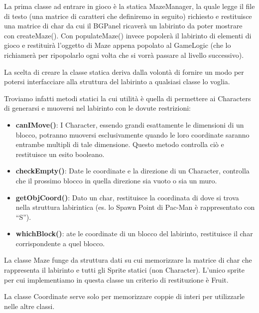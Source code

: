\documentclass[12pt,a4paper]{report}
\begin{document}
La prima classe ad entrare in gioco è la statica MazeManager, la quale legge il file di testo (una matrice di caratteri che definiremo in seguito) richiesto e restituisce una matrice di char da cui il BGPanel ricaverà un labirinto da poter mostrare con createMaze(). Con populateMaze() invece popolerà il labirinto di elementi di gioco e restituirà l’oggetto di Maze appena popolato al GameLogic (che lo richiamerà per ripopolarlo ogni volta che si vorrà passare al livello successivo).

La scelta di creare la classe statica deriva dalla volontà di fornire un modo per potersi interfacciare alla struttura del labirinto a qualsiasi classe lo voglia.

Troviamo infatti metodi statici la cui utilità è quella di permettere ai Characters di generarsi e muoversi nel labirinto con le dovute restrizioni:
\begin{itemize}
 \item \textbf{canIMove()}: I Character, essendo grandi esattamente le dimensioni di un blocco, potranno muoversi esclusivamente quando le loro coordinate saranno entrambe multipli di tale dimensione. Questo metodo controlla ciò e restituisce un esito booleano.
 \item \textbf{checkEmpty()}: Date le coordinate e la direzione di un Character, controlla che il prossimo blocco in quella direzione sia vuoto o sia un muro.
 \item \textbf{getObjCoord()}: Dato un char, restituisce la coordinata di dove si trova nella struttura labirintica (es. lo Spawn Point di Pac-Man è rappresentato con “S”).
 \item \textbf{whichBlock()}: ate le coordinate di un blocco del labirinto, restituisce il char corrispondente a quel blocco.
\end{itemize}

La classe Maze funge da struttura dati su cui memorizzare la matrice di char che rappresenta il labirinto e tutti gli Sprite statici (non Character). L’unico sprite per cui implementiamo in questa classe un criterio di restituzione è Fruit.

La classe Coordinate serve solo per memorizzare coppie di interi per utilizzarle nelle altre classi.\newpage
\end{document}
